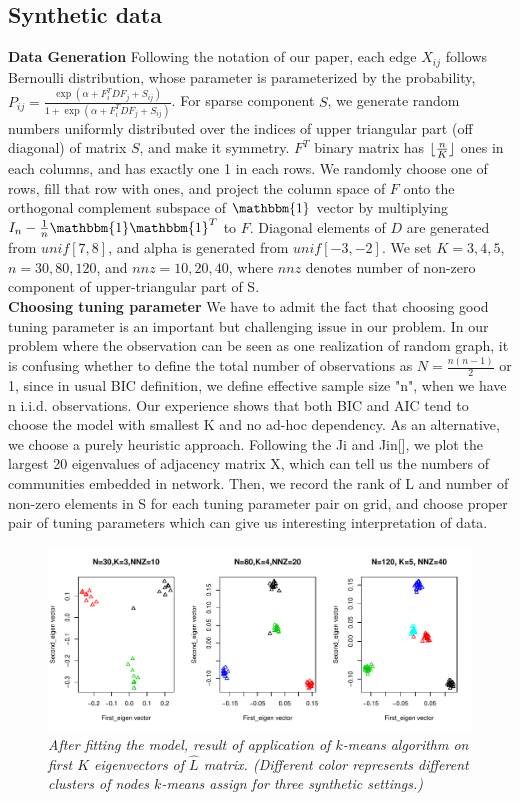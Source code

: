 \documentclass{article}
\DeclarePairedDelimiter\floor{\lfloor}{\rfloor}
\begin{document}
\subsection{Synthetic data} 
\textbf{Data Generation} Following the notation of our paper, each edge $X_{ij}$ follows Bernoulli distribution, whose parameter is parameterized by the probability, $P_{ij}=\frac{\exp (
\alpha+F_{i}^{T}DF_{j} +  S_{ij})}{1+\exp(\alpha+F_{i}^{T}DF_{j}+S_{ij})}$. For sparse component $S$, we generate random numbers uniformly distributed over the indices of upper triangular part (off diagonal) of matrix $S$, and make it symmetry. $F^{T}$ binary matrix has $\floor{\frac{n}{K}}$ ones in each columns, and has exactly one 1 in each rows.  
We randomly choose one of rows, fill that row with ones, and project the column space of $F$ onto the orthogonal complement subspace of $\mathbbm{1}$ vector by multiplying $I_{n}-\frac{1}{n}\mathbbm{1}\mathbbm{1}^T$ to $F$. Diagonal elements of $D$ are generated from $unif[7,8]$, and alpha is generated from $unif[-3,-2]$. We set $K=3,4,5$, $n=30,80,120$, and $nnz = 10, 20, 40$, where $nnz$ denotes number of non-zero component of upper-triangular part of S.\\ 

\noindent \textbf{Choosing tuning parameter}
We have to admit the fact that choosing good tuning parameter is an important but challenging issue in our problem. 
In our problem where the observation can be seen as one realization of random graph, it is confusing whether to define the total number of observations as $N=\frac{n(n-1)}{2}$ or 1, since in usual BIC definition, we define effective sample size "n", when we have n i.i.d. observations. Our experience shows that both BIC and AIC tend to choose the model with smallest K and no ad-hoc dependency. As an alternative, we choose a purely heuristic approach. Following the Ji and Jin[], we plot the largest 20 eigenvalues of adjacency matrix X, which can tell us the numbers of communities embedded in network. Then, we record the rank of L and number of non-zero elements in S for each tuning parameter pair on grid, and choose proper pair of tuning parameters which can give us interesting interpretation of data. \\

\begin{figure}[!h]
\includegraphics[width=1\textwidth]{Fig1.pdf}
\caption{\it After fitting the model, result of application of $k$-means algorithm on first $K$ eigenvectors of $\hat{L}$ matrix. (Different color represents different clusters of nodes $k$-means assign for three synthetic settings.) }
\label{fig:figure1}
\end{figure}
\end{document}
